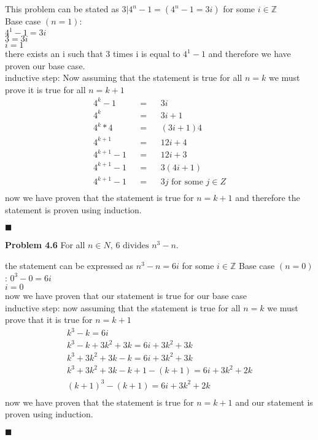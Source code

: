 \documentclass[12pt]{article}
\newcommand{\Z}{\mathbb{Z}}
\renewcommand{\qed}{\hfill$\blacksquare$}
\begin{document}
\begin{addmargin}[1em]{1em}
    This problem can be stated as $3|4^n-1 = (4^n-1 =3i)$ for some $i \in \Z$\\
    Base case $(n=1)$:\\
    $4^1-1=3i$\\
    $3=3i$\\
    $i=1$\\
    there exists an i such that 3 times i is equal to $4^1-1$ and therefore we have proven our base case.\\

    inductive step:
    Now assuming that the statement is true for all $n=k$ we must prove it is true for all $n=k+1$\\
    \begin{align*}
        &4^k-1& &=& &3i&\\
        &4^k& &=& &3i+1&\\
        &4^k *4& &=& &(3i+1)4&\\
        &4^{k+1}& &=& &12i+4&\\
        &4^{k+1}-1 &&=& &12i+3&\\
        &4^{k+1} -1&&=& &3(4i + 1)&\\
        &4^{k+1} -1&&=& &3j\text{ for some }j \in Z&\\
    \end{align*}
    now we have proven that the statement is true for $n=k+1$ and therefore the statement is proven using induction.
    \begin{flushright}
    \qed
    \end{flushright}
\end{addmargin}
\noindent\textbf{Problem 4.6} For all $n \in N\text{, } 6 \text{ divides } n^3-n$.\\
\begin{addmargin}[1em]{1em}
    the statement can be expressed as $n^3-n=6i$ for some $i \in \Z$
    Base case $(n=0)$:
    $0^3-0=6i$\\
    $i=0$\\
    now we have proven that our statement is true for our base case\\
    inductive step:
    now assuming that the statement is true for all $n=k$ we must prove that it is true for $n=k+1$\\
    \begin{align*}
        &k^3-k=6i&\\
        &k^3-k + 3k^2 + 3k =6i + 3k^2 + 3k&\\
        &k^3 + 3k^2 + 3k -k=6i + 3k^2 + 3k&\\
        &k^3 + 3k^2 + 3k -k + 1 - (k + 1)=6i + 3k^2 + 2k\\
        &(k+1)^3 -(k+1) = 6i + 3k^2 + 2k&\\
    \end{align*}
    now we have proven that the statement is true for $n=k+1$ and our statement is proven using induction.
    \begin{flushright}
    \qed
    \end{flushright}
\end{addmargin}
\end{document}
